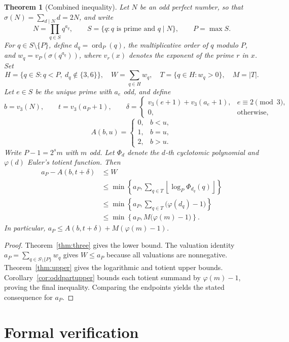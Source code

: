 \documentclass[11pt]{article}
\newtheorem{theorem}{Theorem}
\theoremstyle{remark}
\DeclareMathOperator{\ord}{ord}
\begin{document}
\begin{theorem}[Combined inequality]\label{thm:combined}
Let $N$ be an odd perfect number, so that
$\sigma(N)=\sum_{d\mid N}d=2N$, and write
\[
 N=\prod_{q\in S}q^{a_q},\qquad
 S=\{q:q\text{ is prime and }q\mid N\},\qquad P=\max S.
\]
For $q\in S\setminus\{P\}$, define
$d_q=\ord_P(q)$, the multiplicative order of $q$ modulo $P$, and
$w_q=v_P(\sigma(q^{a_q}))$, where $v_r(x)$ denotes the exponent of the prime
$r$ in $x$. Set
\[
 H=\{q\in S:q<P,\ d_q\notin\{3,6\}\},\quad
 W=\sum_{q\in H}w_q,\quad
 T=\{q\in H:w_q>0\},\quad M=|T|.
\]
Let $e\in S$ be the unique prime with $a_e$ odd, and define
\[
 b=v_3(N),\qquad t=v_3(a_P+1),\qquad
 \delta=\begin{cases}
 v_3(e+1)+v_3(a_e+1),&e\equiv2\pmod3,\\
 0,&\text{otherwise},
 \end{cases}
\]
\[
 A(b,u)=\begin{cases}
 0,&b<u,\\ 1,&b=u,\\ 2,&b>u.
 \end{cases}
\]
Write $P-1=2^s m$ with $m$ odd. Let $\Phi_d$ denote the $d$-th cyclotomic
polynomial and $\varphi(d)$ Euler's totient function. Then
\begin{equation}\label{eq:combined}
\boxed{\begin{aligned}
 a_P-A(b,t+\delta)&\le W\\
 &\le\min\!\left\{a_P,\sum_{q\in T}
   \left\lfloor\log_P\Phi_{d_q}(q)\right\rfloor\right\}\\
 &\le\min\!\left\{a_P,\sum_{q\in T}
   \bigl(\varphi(d_q)-1\bigr)\right\}\\
 &\le\min\!\left\{a_P,M\bigl(\varphi(m)-1\bigr)\right\}.
\end{aligned}}
\end{equation}
In particular, $a_P\le A(b,t+\delta)+M(\varphi(m)-1)$.
\end{theorem}
\begin{proof}
Theorem~\ref{thm:three} gives the lower bound. The valuation identity
$a_P=\sum_{q\in S\setminus\{P\}}w_q$ gives $W\le a_P$ because all valuations
are nonnegative. Theorem~\ref{thm:upper} gives the logarithmic and totient
upper bounds. Corollary~\ref{cor:oddpartupper} bounds each totient summand by
$\varphi(m)-1$, proving the final inequality. Comparing the endpoints yields
the stated consequence for $a_P$.
\end{proof}

\section{Formal verification}\label{sec:lean}
\end{document}
